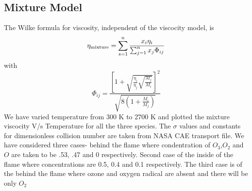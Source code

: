 \subsection{Mixture Model}
\noindent The Wilke formula for viscosity, independent of
the viscocity model, is
\begin{equation}
\eta_{\textnormal{mixture}} = \sum_{s=1}^{n} \frac {x_i \eta_i}{\sum_{j=1}^{n} x_j \Phi_{ij}}
\end{equation}
with
\begin{equation}
\Phi_{ij} = \frac{
                \left[
                     1 + \sqrt{\frac{\eta_i}{\eta_j}\sqrt{\frac{M_j}{M_i}}}
                \right]^2
                }{\sqrt{8\left(1 + \frac{M_i}{M_j}\right)}}
\end{equation}
\noindent  We have varied temperature from 300 K to 2700 K and plotted the mixture viscocity V/s Temperature for all the  three species. The $\sigma$ values and constants for dimensionless collision number are taken from NASA CAE transport file. We have considered three cases-  behind the flame where condentration of $O_3$,$O_2$ and $O$ are taken to be .53, .47 and 0 respectively. Second case of the inside of the flame where concentrations are 0.5, 0.4 and 0.1 respectively. The third case is of the behind the flame where ozone and oxygen radical are absent and there will be only $O_2$




